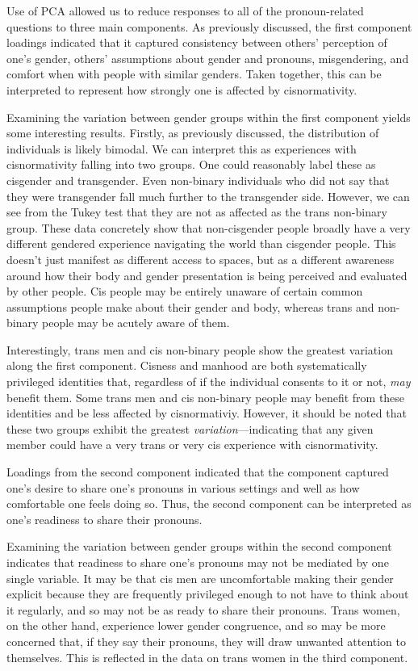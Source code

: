 \documentclass[12pt,twoside]{reedthesis}
\begin{document}
Use of PCA allowed us to reduce responses to all of the pronoun-related questions to three main components. As previously discussed, the first component loadings indicated that it captured consistency between others' perception of one's gender, others' assumptions about gender and pronouns, misgendering, and comfort when with people with similar genders. Taken together, this can be interpreted to represent how strongly one is affected by cisnormativity.

Examining the variation between gender groups within the first component yields some interesting results. Firstly, as previously discussed, the distribution of individuals is likely bimodal. We can interpret this as experiences with cisnormativity falling into two groups. One could reasonably label these as cisgender and transgender. Even non-binary individuals who did not say that they were transgender fall much further to the transgender side. However, we can see from the Tukey test that they are not as affected as the trans non-binary group. These data concretely show that non-cisgender people broadly have a very different gendered experience navigating the world than cisgender people. This doesn't just manifest as different access to spaces, but as a different awareness around how their body and gender presentation is being perceived and evaluated by other people. Cis people may be entirely unaware of certain common assumptions people make about their gender and body, whereas trans and non-binary people may be acutely aware of them.

Interestingly, trans men and cis non-binary people show the greatest variation along the first component. Cisness and manhood are both systematically privileged identities that, regardless of if the individual consents to it or not, \emph{may} benefit them. Some trans men and cis non-binary people may benefit from these identities and be less affected by cisnormativiy. However, it should be noted that these two groups exhibit the greatest \emph{variation}---indicating that any given member could have a very trans or very cis experience with cisnormativity.

Loadings from the second component indicated that the component captured one's desire to share one's pronouns in various settings and well as how comfortable one feels doing so. Thus, the second component can be interpreted as one's readiness to share their pronouns.

Examining the variation between gender groups within the second component indicates that readiness to share one's pronouns may not be mediated by one single variable. It may be that cis men are uncomfortable making their gender explicit because they are frequently privileged enough to not have to think about it regularly, and so may not be as ready to share their pronouns. Trans women, on the other hand, experience lower gender congruence, and so may be more concerned that, if they say their pronouns, they will draw unwanted attention to themselves. This is reflected in the data on trans women in the third component.
\end{document}

